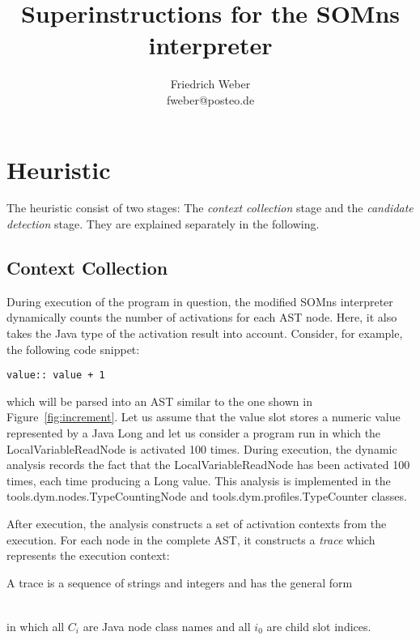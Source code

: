 \documentclass[10pt,a4paper]{article}
\author{Friedrich Weber\\
\small fweber@posteo.de}
\title{Superinstructions for the SOMns interpreter}
\begin{document}
	
\maketitle

\section{Heuristic}

The heuristic consist of two stages: The \emph{context collection} stage and the \emph{candidate detection} stage. They are explained separately in the following.

\subsection{Context Collection}

During execution of the program in question, the modified SOMns interpreter dynamically counts the number of activations for each AST node. Here, it also takes the Java type of the activation result into account. Consider, for example, the following code snippet:
\begin{verbatim}
value:: value + 1
\end{verbatim}
which will be parsed into an AST similar to the one shown in Figure~\ref{fig:increment}. Let us assume that the \textsf{value} slot stores a numeric value represented by a Java \textsf{Long} and let us consider a program run in which the \textsf{LocalVariableReadNode} is activated 100 times. During execution, the dynamic analysis records the fact that the \textsf{LocalVariableReadNode} has been activated 100 times, each time producing a \textsf{Long} value. This analysis is implemented in the \textsf{tools.dym.nodes.TypeCountingNode} and \textsf{tools.dym.profiles.TypeCounter} classes.

After execution, the analysis constructs a set of activation contexts from the execution. For each node in the complete AST, it constructs a \emph{trace} which represents the execution context:

A trace is a sequence of strings and integers and has the general form

\begin{align*}
[ C_0, i_0, C_1, ..., i_{k - 1}, C_{k}]
\end{align*}

in which all $C_i$ are Java node class names and all $i_0$ are child slot indices.

\begin{align*}
[ LocalVariableWriteNode, 0, PrimitiveOperation:+, 0, LocalVariableReadNode]
\end{align*}
\end{document}
